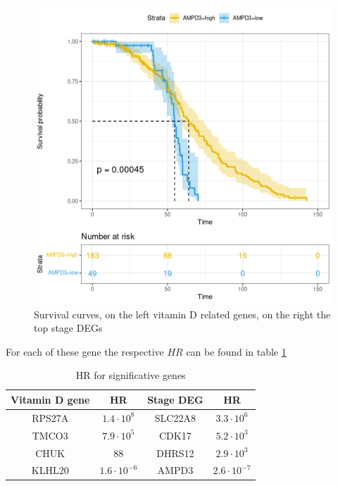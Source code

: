 \documentclass[fleqn,10pt]{SelfArx} %
\begin{document}
\begin{figure}[ht]
\begin{multicols}{2}
			 		\includegraphics[width=0.7\linewidth]{figures/AMPD3.png}

				\end{multicols}
				\caption{Survival curves, on the left vitamin D related genes, on the right the top stage DEGs}
				\label{fig:surv_curve}
			 \end{figure}

			For each of these gene the respective $HR$ can be found in table \ref{tab:hr}

			\begin{table}[ht]
				\begin{tabular}{|cc|cc|}
					\hline
					Vitamin D gene & HR & Stage DEG & HR\\
					\hline
					RPS27A & $1.4\cdot 10^8$ & SLC22A8 & $3.3\cdot 10^6$\\
					\hline
					TMCO3 & $7.9\cdot 10^5$ & CDK17 & $5.2\cdot 10^3$\\
					\hline
					CHUK & $88$ & DHRS12 & $2.9\cdot 10^3$\\
					\hline
					KLHL20 & $1.6\cdot 10^{-6}$ & AMPD3 & $2.6\cdot 10^{-7}$\\
					\hline
				\end{tabular}
				\caption{HR for significative genes}
				\label{tab:hr}
			\end{table}
\end{document}
